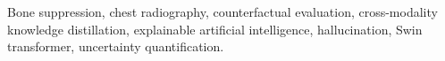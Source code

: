 \documentclass[journal]{IEEEtran}
\begin{document}
\begin{IEEEkeywords}
Bone suppression, chest radiography, counterfactual evaluation, cross-modality knowledge distillation, explainable artificial
intelligence, hallucination, Swin transformer, uncertainty quantification.
\end{IEEEkeywords}











\end{document}
